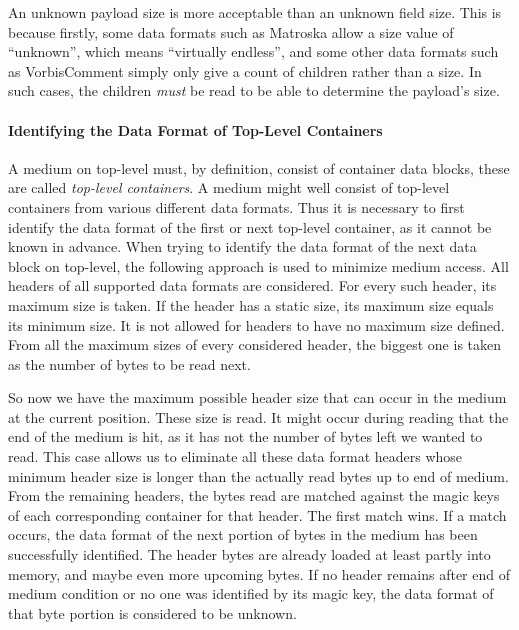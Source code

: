 An unknown payload size is more acceptable than an unknown field size. This is because firstly, some data formats such as Matroska allow a size value of ``unknown'', which means ``virtually endless'', and some other data formats such as VorbisComment simply only give a count of children rather than a size. In such cases, the children \emph{must} be read to be able to determine the payload's size.


\paragraph{Identifying the Data Format of Top-Level Containers}
\label{sec:IdentifyingTheDataFormatOfContainers}

A medium on top-level must, by definition, consist of container data blocks, these are called \emph{top-level containers}. A medium might well consist of top-level containers from various different data formats. Thus it is necessary to first identify the data format of the first or next top-level container, as it cannot be known in advance. When trying to identify the data format of the next data block on top-level, the following approach is used to minimize medium access. All headers of all supported data formats are considered. For every such header, its maximum size is taken. If the header has a static size, its maximum size equals its minimum size. It is not allowed for headers to have no maximum size defined. From all the maximum sizes of every considered header, the biggest one is taken as the number of bytes to be read next.

So now we have the maximum possible header size that can occur in the medium at the current position. These size is read. It might occur during reading that the end of the medium is hit, as it has not the number of bytes left we wanted to read. This case allows us to eliminate all these data format headers whose minimum header size is longer than the actually read bytes up to end of medium. From the remaining headers, the bytes read are matched against the magic keys of each corresponding container for that header. The first match wins. If a match occurs, the data format of the next portion of bytes in the medium has been successfully identified. The header bytes are already loaded at least partly into memory, and maybe even more upcoming bytes. If no header remains after end of medium condition or no one was identified by its magic key, the data format of that byte portion is considered to be unknown.

